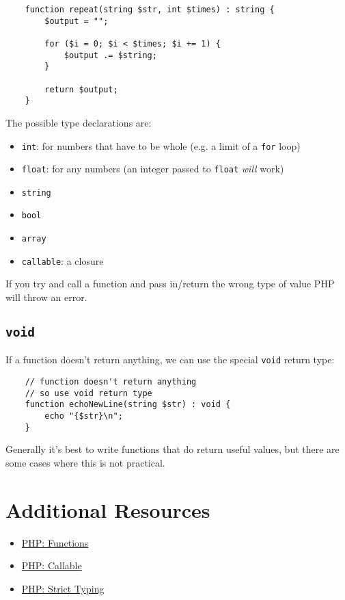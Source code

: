 \begin{verbatim}
    function repeat(string $str, int $times) : string {
        $output = "";

        for ($i = 0; $i < $times; $i += 1) {
            $output .= $string;
        }

        return $output;
    }
\end{verbatim}

The possible type declarations are:

\begin{itemize}
    \item \texttt{int}: for numbers that have to be whole (e.g. a limit of a \texttt{for} loop)
    \item \texttt{float}: for any numbers (an integer passed to \texttt{float} \textit{will} work)
    \item \texttt{string}
    \item \texttt{bool}
    \item \texttt{array}
    \item \texttt{callable}: a closure
\end{itemize}

If you try and call a function and pass in/return the wrong type of value PHP will throw an error.


\subsection{\texttt{void}}

If a function doesn't return anything, we can use the special \texttt{void} return type:

\begin{verbatim}
    // function doesn't return anything
    // so use void return type
    function echoNewLine(string $str) : void {
        echo "{$str}\n";
    }
\end{verbatim}

Generally it's best to write functions that do return useful values, but there are some cases where this is not practical.


\section{Additional Resources}

\begin{itemize}[leftmargin=*]
    \item \href{http://www.php.net/manual/en/functions.user-defined.php}{PHP: Functions}
    \item \href{http://www.php.net/manual/en/language.types.callable.php}{PHP: Callable}
    \item \href{http://www.php.net/manual/en/functions.arguments.php#functions.arguments.type-declaration.strict}{PHP: Strict Typing}
\end{itemize}
